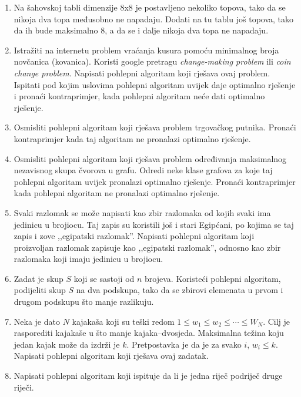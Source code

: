 \documentclass[a4paper, utf8, 11pt, colorlinks]{book}
\theoremstyle{definition}
\begin{document}
\begin{enumerate}
	\item Na šahovskoj tabli dimenzije 8x8 je postavljeno nekoliko topova, tako da se nikoja dva topa međusobno ne napadaju. Dodati na tu tablu još topova, tako da ih bude maksimalno 8, a da se i dalje nikoja dva topa ne napadaju.
	\item Istražiti na internetu problem vraćanja kusura pomoću minimalnog broja novčanica (kovanica). Koristi google pretragu \textit{change-making problem} ili \textit{coin change problem}. Napisati pohlepni algoritam koji rješava ovaj problem. Ispitati pod kojim uslovima pohlepni algoritam uvijek daje optimalno rješenje i pronaći kontraprimjer, kada pohlepni algoritam neće dati optimalno rješenje.

	
	\item Osmisliti pohlepni algoritam koji rješava problem trgovačkog putnika. Pronaći kontraprimjer kada taj algoritam ne pronalazi optimalno rješenje.
	
	\item Osmisliti pohlepni algoritam koji rješava problem određivanja maksimalnog nezavisnog skupa čvorova u grafu. Odredi neke klase grafova za koje taj pohlepni algoritam uvijek pronalazi optimalno rješenje. Pronaći kontraprimjer kada pohlepni algoritam ne pronalazi optimalno rješenje.
	
	\item Svaki razlomak se može napisati kao zbir razlomaka od kojih svaki ima jedinicu u brojiocu. Taj zapis su koristili još i stari Egipćani, po kojima se taj zapis i zove ,,egipatski razlomak''. 
	Napisati pohlepni algoritam koji proizvoljan razlomak zapisuje kao ,,egipatski razlomak'', odnosno kao zbir razlomaka koji imaju jedinicu u brojiocu.
	
	\item Zadat je skup $S$ koji se sastoji od $n$ brojeva. Koristeći pohlepni algoritam, podijeliti skup $S$ na dva podskupa, tako da se zbirovi elemenata u prvom i drugom podskupu što manje razlikuju.
	
	\item Neka je dato $N$ kajakaša koji su teški redom $1\leqslant w_1\leqslant w_2\leqslant \cdots \leqslant W_N$. Cilj je rasporediti kajakaše u što manje kajaka--dvosjeda. Maksimalna težina koju jedan kajak može da izdrži je $k$. Pretpostavka je da je za svako $i$, $w_i\leqslant k$. Napisati pohlepni algoritam koji rješava ovaj zadatak.
	
	\item  Napisati pohlepni algoritam koji ispituje da li je jedna riječ podriječ druge riječi.
	

\end{enumerate}
\end{document}
